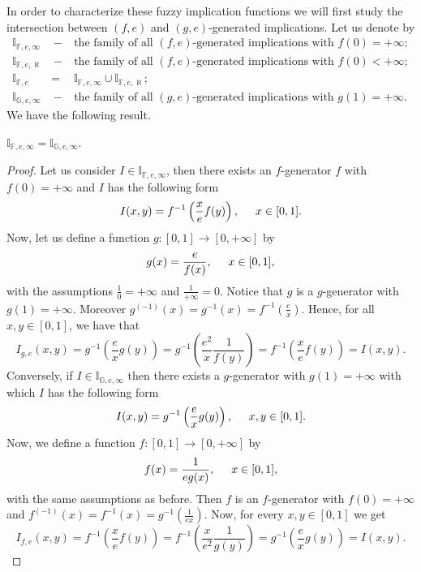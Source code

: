 In order to characterize these fuzzy implication functions we will first study the intersection between $(f,e)$ and $(g,e)$-generated implications. Let us denote by
\begin{eqnarray*}
	\mathbb{I}_{\mathbb{F},e,\infty} &~-~& \text{the family of all } (f,e) \text{-generated implications with } f(0)=+ \infty;\\
	\mathbb{I}_{\mathbb{F},e,\aleph} &~-~& \text{the family of all } (f,e) \text{-generated implications with } f(0)<+ \infty;\\
	\mathbb{I}_{\mathbb{F},e} &=& \mathbb{I}_{\mathbb{F},e,\infty} \cup \mathbb{I}_{\mathbb{F},e,\aleph};\\
	\mathbb{I}_{\mathbb{G},e,\infty} &~-~& \text{the family of all } (g,e) \text{-generated implications with } g(1)=+ \infty.
\end{eqnarray*}
\noindent We have the following result.
\begin{proposition}
	$\mathbb{I}_{\mathbb{F},e,\infty} =\mathbb{I}_{\mathbb{G},e,\infty}$.
\end{proposition}
\begin{proof}
	Let us consider $I \in \mathbb{I}_{\mathbb{F},e,\infty}$, then there exists an $f$-generator $f$ with $f(0)=+ \infty$ and $I$ has the following form
	$$I(x,y)= f^{-1}\left(\frac{x}{e} f(y) \right), \hspace{0.5cm} x \in [0,1].$$
	Now, let us define a function $g:[0,1] \to [0,+ \infty]$ by
	$$g(x)=\frac{e}{f(x)}, \hspace{0.5cm} x \in [0,1],$$
	\noindent with the assumptions $\frac{1}{0}=+\infty$ and $ \frac{1}{+ \infty}=0$. Notice that $g$ is a $g$-generator with $g(1)=+\infty$. Moreover $g^{(-1)}(x)=g^{-1}(x)=f^{-1}(\frac{e}{x})$. Hence, for all $x,y \in [0,1]$, we have that
	$$I_{g,e}(x,y)=g^{-1}\left(\frac{e}{x}g(y)\right)=g^{-1}\left(\frac{e^2}{x}\frac{1}{f(y)}\right) = f^{-1}\left(\frac{x}{e}f(y)\right)=I(x,y).$$
	Conversely, if $I \in \mathbb{I}_{\mathbb{G},e,\infty}$ then there exists a $g$-generator with $g(1)=+ \infty$ with which $I$ has the following form
	$$I(x,y) = g^{-1}\left(\frac{e}{x}g(y)\right), \hspace{0.5cm} x,y \in [0,1].$$
	Now, we define a function $f:[0,1] \to [0,+\infty]$ by
	$$f(x)=\frac{1}{eg(x)}, \hspace{0.5cm} x \in [0,1],$$ 
	\noindent with the same assumptions as before. Then $f$ is an $f$-generator with $f(0)= + \infty$ and $f^{(-1)}(x)=f^{-1}(x)=g^{-1}(\frac{1}{ex})$. Now, for every $x,y \in [0,1]$ we get
	$$I_{f,e}(x,y) =f^{-1}\left(\frac{x}{e}f(y)\right) = f^{-1}\left(\frac{x}{e^2}\frac{1}{g(y)}\right)=g^{-1}\left(\frac{e}{x}g(y)\right)=I(x,y).$$
\end{proof}

